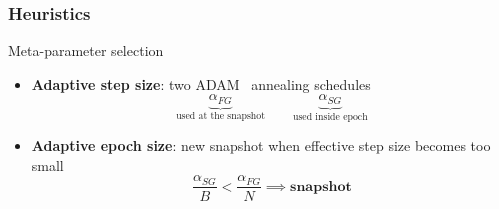 \documentclass[aspectratio=169]{beamer}
\newcommand{\enb}[1]{\textcolor{poliblue1}{\textbf{#1}}}
\begin{document}
\begin{frame} 
\frametitle{Heuristics} 
Meta-parameter selection

\begin{itemize}
	\item \enb{Adaptive step size}: two ADAM~\citep{kingma2014adam} annealing schedules
	 \begin{equation*}
	 	\underbrace{\alpha_{FG}}_{\text{used at the snapshot}} \qquad \underbrace{\alpha_{SG}}_{\text{used inside epoch}}
	 \end{equation*}
	 \vspace*{.5cm}
	\item \enb{Adaptive epoch size}: new snapshot when effective step size becomes too small
	\begin{equation*}
		\frac{\alpha_{SG}}{B} < \frac{\alpha_{FG}}{N} \implies \textbf{snapshot}
	\end{equation*}
\end{itemize}

\end{frame}
\end{document}
